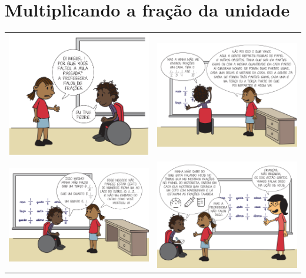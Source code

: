     
\setcounter{chapter}{1}
\setcounter{subsection}{0}
\chapter{Multiplicando a fração da unidade }


\begin{tabular}{cc}
 \includegraphics[width=.45\textwidth, keepaspectratio]{..//media/cap2/secoes/pngs_licao_02/quadrinho_01.png}   & \includegraphics[width=.45\textwidth, keepaspectratio]{..//media/cap2/secoes/pngs_licao_02/quadrinho_02.png}   \\
 \includegraphics[width=.45\textwidth, keepaspectratio]{..//media/cap2/secoes/pngs_licao_02/quadrinho_03.png} & \includegraphics[width=.45\textwidth, keepaspectratio]{..//media/cap2/secoes/pngs_licao_02/quadrinho_04.png}     
\end{tabular}
  
